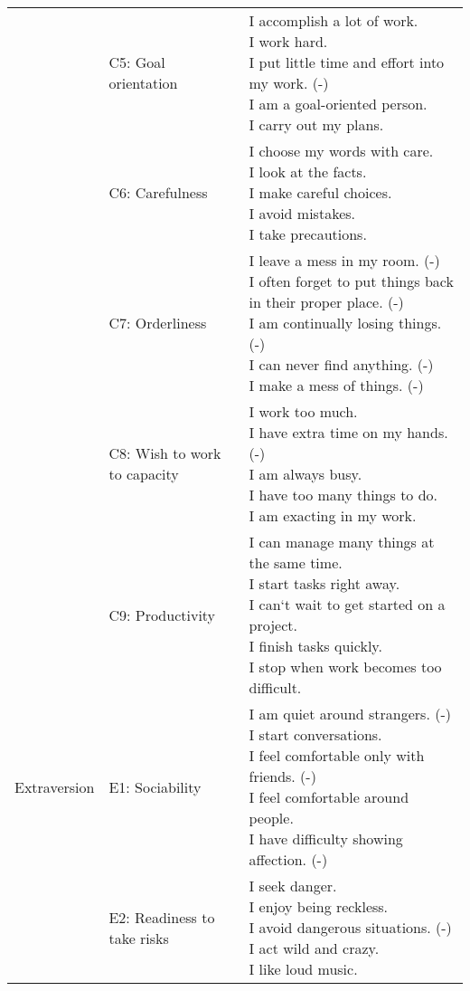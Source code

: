 \documentclass[,man,floatsintext]{apa6}
\theoremstyle{definition}
\theoremstyle{definition}
\theoremstyle{definition}
\theoremstyle{remark}
\begin{document}
\begin{longtable}[t]{lll}
\addlinespace
 & C5: Goal orientation & \makecell[l]{I accomplish a lot of work.\\I work hard.\\I put little time and effort into my work. (-)\\I am a goal-oriented person.\\I carry out my plans.}\\
\addlinespace
 & C6: Carefulness & \makecell[l]{I choose my words with care.\\I look at the facts.\\I make careful choices.\\I avoid mistakes.\\I take precautions.}\\
\addlinespace
 & C7: Orderliness & \makecell[l]{I leave a mess in my room. (-)\\I often forget to put things back in their proper place. (-)\\I am continually losing things. (-)\\I can never find anything. (-)\\I make a mess of things. (-)}\\
\addlinespace
 & C8: Wish to work to capacity & \makecell[l]{I work too much.\\I have extra time on my hands. (-)\\I am always busy.\\I have too many things to do.\\I am exacting in my work.}\\
\addlinespace
 & C9: Productivity & \makecell[l]{I can manage many things at the same time.\\I start tasks right away.\\I can`t wait to get started on a project.\\I finish tasks quickly.\\I stop when work becomes too difficult.}\\
\addlinespace
Extraversion & E1: Sociability & \makecell[l]{I am quiet around strangers. (-)\\I start conversations.\\I feel comfortable only with friends. (-)\\I feel comfortable around people.\\I have difficulty showing affection. (-)}\\
\addlinespace
 & E2: Readiness to take risks & \makecell[l]{I seek danger.\\I enjoy being reckless.\\I avoid dangerous situations. (-)\\I act wild and crazy.\\I like loud music.}\\

\end{longtable}
\end{document}
